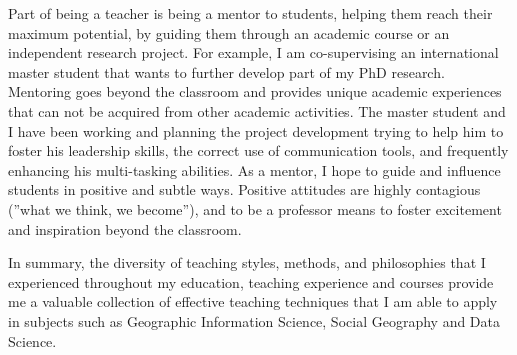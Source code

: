 
Part of being a teacher is being a mentor to students, helping them reach their maximum potential, by guiding them through an academic course or an independent research project. For example, I am co-supervising an international master student that wants to further develop part of my PhD research. Mentoring goes beyond the classroom and provides unique academic experiences that can not be acquired from other academic activities. The master student and I have been working and planning the project development trying to help him to foster his leadership skills, the correct use of communication tools, and frequently enhancing his multi-tasking abilities. As a mentor, I hope to guide and influence students in positive and subtle ways. Positive attitudes are highly contagious (”what we think, we become”), and to be a professor means to foster excitement and inspiration beyond the classroom. \par





In summary, the diversity of teaching styles, methods, and philosophies that I experienced throughout my education, teaching experience and courses provide me a valuable collection of effective teaching techniques that I am able to apply in subjects such as Geographic Information Science, Social Geography and Data Science.\par


